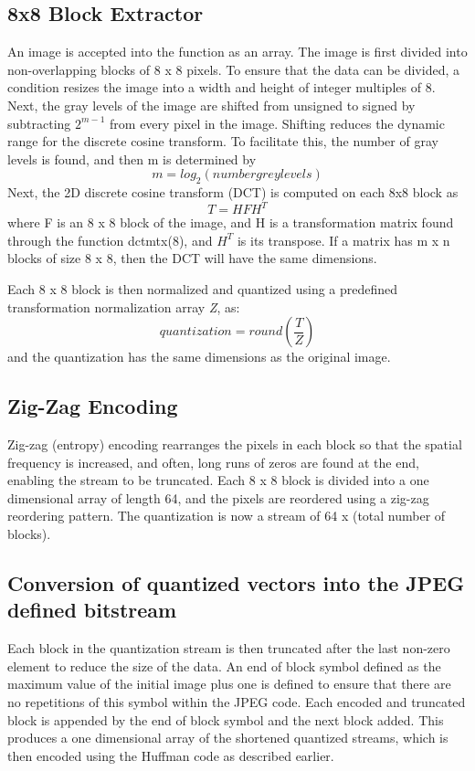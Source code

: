 \documentclass[11pt,a4paper,table]{article}
\begin{document}
\subsection{8x8 Block Extractor}
An image is accepted into the function as an array. The image is first divided into non-overlapping blocks of 8 x 8 pixels. To ensure that the data can be divided, a condition resizes the image into a width and height of integer multiples of 8. Next, the gray levels of the image are shifted from unsigned to signed by subtracting \(2^{m-1}\) from every pixel in the image. Shifting reduces the dynamic range for the discrete cosine transform. To facilitate this, the number of gray levels is found, and then m is determined by 
\begin{equation}
m = log_2(number grey levels)
\end{equation}
Next, the 2D discrete cosine transform (DCT) is computed on each 8x8 block as
\begin{equation}
T = HFH^T
\end{equation}
where F is an 8 x 8 block of the image, and H is a transformation matrix found through the function dctmtx(8), and \(H^T\) is its transpose. If a matrix has m x n blocks of size 8 x 8, then the DCT will have the same dimensions.

Each 8 x 8 block is then normalized and quantized using a predefined transformation normalization array \textit{Z}, as:
\begin{equation}
quantization= round (\frac{T}{Z})
\end{equation}
and the quantization has the same dimensions as the original image. 

\subsection{Zig-Zag Encoding}
Zig-zag (entropy) encoding rearranges the pixels in each block so that the spatial frequency is increased, and often, long runs of zeros are found at the end, enabling the stream to be truncated. Each 8 x 8 block is divided into a one dimensional array of length 64, and the pixels are reordered using a zig-zag reordering pattern. The quantization is now a stream of 64 x (total number of blocks).

\subsection{Conversion of quantized vectors into the JPEG defined bitstream}
Each block in the quantization stream is then truncated after the last non-zero element to reduce the size of the data. An end of block symbol defined as the maximum value of the initial image plus one is defined to ensure that there are no repetitions of this symbol within the JPEG code. Each encoded and truncated block is appended by the end of block symbol and the next block added. This produces a one dimensional array of the shortened quantized streams, which is then encoded using the Huffman code as described earlier.
\end{document}
